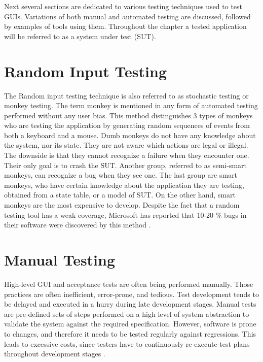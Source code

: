 Next several sections are dedicated to various testing techniques used to test GUIs. Variations of both manual and automated testing are discussed, followed by examples of tools using them. Throughout the chapter a tested application will be referred to as a system under test (SUT).

\section{Random Input Testing}
The Random input testing technique is also referred to as stochastic testing or monkey testing. The term monkey is mentioned in any form of automated testing performed without any user bias. This method distinguishes 3 types of monkeys who are testing the application by generating random sequences of events from both a keyboard and a mouse. Dumb monkeys do not have any knowledge about the system, nor its state. They are not aware which actions are legal or illegal. The downside is that they cannot recognize a failure when they encounter one. Their only goal is to crash the SUT. Another group, referred to as semi-smart monkeys, can recognize a bug when they see one. The last group are smart monkeys, who have certain knowledge about the application they are testing, obtained from a state table, or a model of SUT. On the other hand, smart monkeys are the most expensive to develop. Despite the fact that a random testing tool has a weak coverage, Microsoft has reported that 10-20 \% bugs in their software were discovered by this method \cite{nyman}.

\section{Manual Testing}
High-level GUI and acceptance tests are often being performed manually. Those practices are often inefficient, error-prone, and tedious. Test development tends to be delayed and executed in a hurry during late development stages. Manual tests are pre-defined sets of steps performed on a high level of system abstraction to validate the system against the required specification. However, software is prone to changes, and therefore it needs to be tested regularly against regressions. This leads to excessive costs, since testers have to continuously re-execute test plans throughout development stages \cite{guitesting}.

